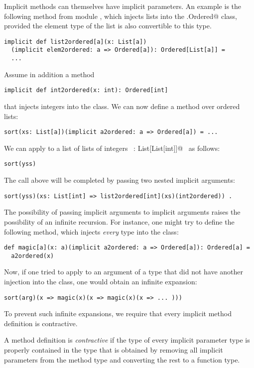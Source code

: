 Implicit methods can themselves have implicit parameters. An example
is the following method from module , which injects
lists into the \lstinline@scala.Ordered@ class, provided the element
type of the list is also convertible to this type.
\begin{lstlisting}
implicit def list2ordered[a](x: List[a])
  (implicit elem2ordered: a => Ordered[a]): Ordered[List[a]] = 
  ...
\end{lstlisting}
Assume in addition a method
\begin{lstlisting}
implicit def int2ordered(x: int): Ordered[int]
\end{lstlisting}
that injects integers into the \lstinline@Ordered@ class.  We can now
define a  method over ordered lists:
\begin{lstlisting}
sort(xs: List[a])(implicit a2ordered: a => Ordered[a]) = ...
\end{lstlisting}
We can apply  to a list of lists of integers ~\lstinline@yss: List[List[int]]@~ 
as follows:
\begin{lstlisting}
sort(yss)
\end{lstlisting}
The call above will be completed by passing two nested implicit arguments:
\begin{lstlisting}
sort(yss)(xs: List[int] => list2ordered[int](xs)(int2ordered)) .
\end{lstlisting}
The possibility of passing implicit arguments to implicit arguments
raises the possibility of an infinite recursion.  For instance, one
might try to define the following method, which injects {\em every} type into the \lstinline@Ordered@ class:
\begin{lstlisting}
def magic[a](x: a)(implicit a2ordered: a => Ordered[a]): Ordered[a] = 
  a2ordered(x)
\end{lstlisting}
Now, if one tried to apply
\lstinline@sort@ to an argument  of a type that did not have
another injection into the  class, one would obtain an infinite
expansion:
\begin{lstlisting}
sort(arg)(x => magic(x)(x => magic(x)(x => ... )))
\end{lstlisting}
To prevent such infinite expansions, we require that every implicit 
method definition is contractive.

A method definition is {\em contractive} if the type of every implicit
parameter type is properly contained in the type that is obtained by
removing all implicit parameters from the method type and converting
the rest to a function type.

